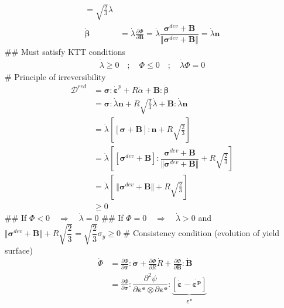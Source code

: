 \documentclass[]{scrartcl}
\begin{document}
\begin{easylist}
\begin{align*}
  = \sqrt{\frac{2}{3}} \dot{\lambda}
\\
\dot{\boldsymbol{\beta}} 
 &= \dot{\lambda} \frac{\partial \Phi}{\partial \boldsymbol{B}}
  = \dot{\lambda} \dfrac{\boldsymbol{\sigma}^{dev} + \boldsymbol{B}}{\Vert \boldsymbol{\sigma}^{dev} + \boldsymbol{B} \Vert}
  = \dot{\lambda} \boldsymbol{n}
\end{align*}
## Must satisfy KTT conditions
\begin{gather*}
\dot{\lambda} \geq 0
\quad;\quad
\Phi \leq 0
\quad;\quad
\dot{\lambda} \Phi = 0
\end{gather*}
# Principle of irreversibility
\begin{align*}
\mathcal{D}^{red}
 &= \boldsymbol{\sigma} : \dot{\boldsymbol{\varepsilon}}^{p}
  + R \dot{\alpha}
  + \boldsymbol{B} : \dot{\boldsymbol{\beta}} \\
 &= \boldsymbol{\sigma} : \dot{\lambda} \boldsymbol{n}
   + R \sqrt{\frac{2}{3}} \dot{\lambda}
   + \boldsymbol{B} : \dot{\lambda} \boldsymbol{n} \\
 &= \dot{\lambda} \left[ \left[ 
    \boldsymbol{\sigma} + \boldsymbol{B} \right] : \boldsymbol{n}
   + R \sqrt{\frac{2}{3}}
   \right] \\
 &= \dot{\lambda} \left[ \left[ 
    \boldsymbol{\sigma}^{dev} + \boldsymbol{B} \right] : \dfrac{\boldsymbol{\sigma}^{dev} + \boldsymbol{B}}{\Vert \boldsymbol{\sigma}^{dev} + \boldsymbol{B} \Vert}
   + R \sqrt{\frac{2}{3}}
   \right] \\
 &= \dot{\lambda} \left[ \
    \Vert \boldsymbol{\sigma}^{dev} + \boldsymbol{B} \Vert
   + R \sqrt{\frac{2}{3}}
   \right] \\
 &\geq 0
\end{align*}
## If $\Phi < 0 \quad \Rightarrow \quad \dot{\lambda} = 0$
## If $\Phi = 0 \quad \Rightarrow \quad \dot{\lambda} > 0$ 
   and $\Vert \boldsymbol{\sigma}^{dev} + \boldsymbol{B} \Vert + R \sqrt{\dfrac{2}{3}} = \sqrt{\dfrac{2}{3}} \sigma_{y} \geq 0$
# Consistency condition (evolution of yield surface)
\begin{align*}
\dot{\Phi}
 &= \frac{\partial \Phi}{\partial \boldsymbol{\sigma}} : \dot{\boldsymbol{\sigma}}
  + \frac{\partial \Phi}{\partial R} \dot{R}
  + \frac{\partial \Phi}{\partial \boldsymbol{B}} : \dot{\boldsymbol{B}} \\
 &= \frac{\partial \Phi}{\partial \boldsymbol{\sigma}} : \dfrac{\partial^{2} \psi}{\partial \boldsymbol{\varepsilon^{e}} \otimes \partial \boldsymbol{\varepsilon^{e}}} : \underbrace{ \left[ \dot{\boldsymbol{\varepsilon}} - \dot{\boldsymbol{\varepsilon^{p}}} \right]}_{\dot{\boldsymbol{\varepsilon^{e}}}}

\end{align*}
\end{easylist}
\end{document}

